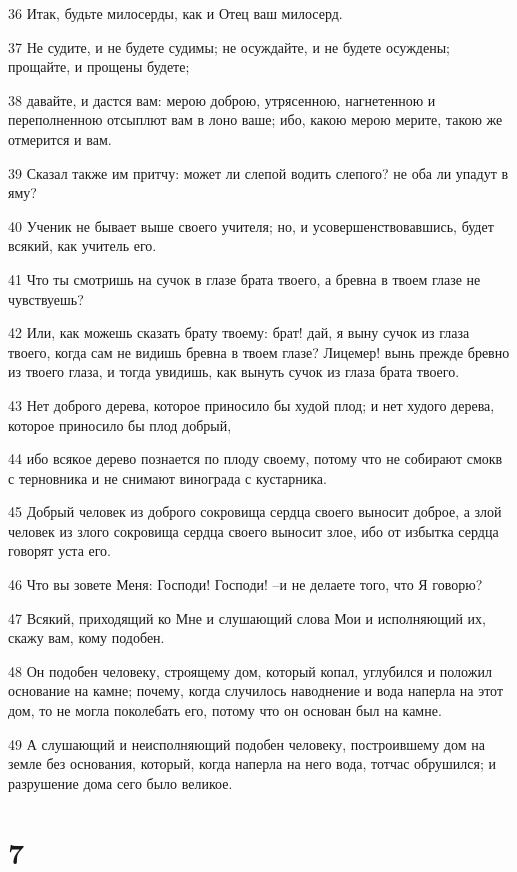 \par 36 Итак, будьте милосерды, как и Отец ваш милосерд.
\par 37 Не судите, и не будете судимы; не осуждайте, и не будете осуждены; прощайте, и прощены будете;
\par 38 давайте, и дастся вам: мерою доброю, утрясенною, нагнетенною и переполненною отсыплют вам в лоно ваше; ибо, какою мерою мерите, такою же отмерится и вам.
\par 39 Сказал также им притчу: может ли слепой водить слепого? не оба ли упадут в яму?
\par 40 Ученик не бывает выше своего учителя; но, и усовершенствовавшись, будет всякий, как учитель его.
\par 41 Что ты смотришь на сучок в глазе брата твоего, а бревна в твоем глазе не чувствуешь?
\par 42 Или, как можешь сказать брату твоему: брат! дай, я выну сучок из глаза твоего, когда сам не видишь бревна в твоем глазе? Лицемер! вынь прежде бревно из твоего глаза, и тогда увидишь, как вынуть сучок из глаза брата твоего.
\par 43 Нет доброго дерева, которое приносило бы худой плод; и нет худого дерева, которое приносило бы плод добрый,
\par 44 ибо всякое дерево познается по плоду своему, потому что не собирают смокв с терновника и не снимают винограда с кустарника.
\par 45 Добрый человек из доброго сокровища сердца своего выносит доброе, а злой человек из злого сокровища сердца своего выносит злое, ибо от избытка сердца говорят уста его.
\par 46 Что вы зовете Меня: Господи! Господи! --и не делаете того, что Я говорю?
\par 47 Всякий, приходящий ко Мне и слушающий слова Мои и исполняющий их, скажу вам, кому подобен.
\par 48 Он подобен человеку, строящему дом, который копал, углубился и положил основание на камне; почему, когда случилось наводнение и вода наперла на этот дом, то не могла поколебать его, потому что он основан был на камне.
\par 49 А слушающий и неисполняющий подобен человеку, построившему дом на земле без основания, который, когда наперла на него вода, тотчас обрушился; и разрушение дома сего было великое.

\chapter{7}

